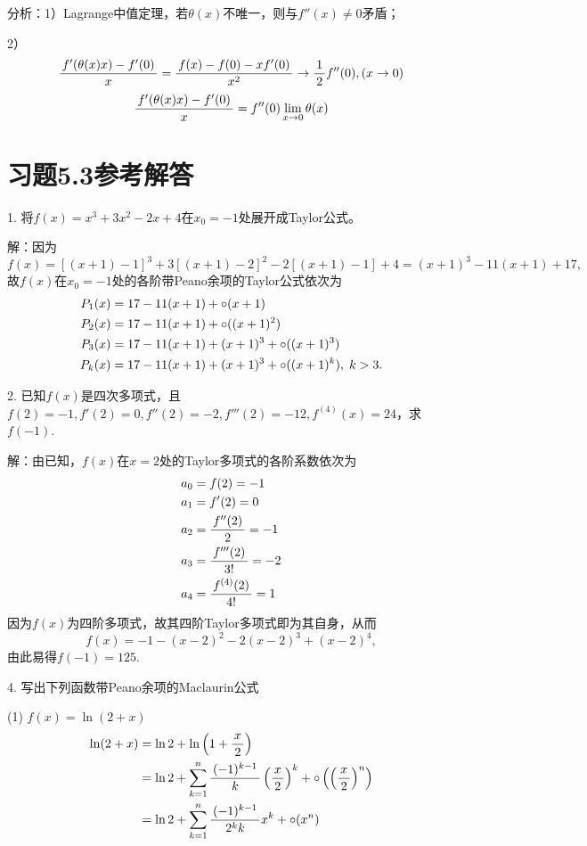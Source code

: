 分析：1）Lagrange中值定理，若$\theta(x)$不唯一，则与$f''(x)\ne 0$矛盾；

2）
$$\displaystyle\frac{\,{f'(\theta(x)x)-f'(0)}\,}{\,{x}\,}=\displaystyle\frac{\,{f(x)-f(0)-xf'(0)}\,}{\,{x^2}\,}\to\displaystyle\frac{\,{1}\,}{\,{2}\,}f''(0),(x\to0)$$
$$\displaystyle\frac{\,{f'(\theta(x)x)-f'(0)}\,}{\,{x}\,}=f''(0)\lim\limits_{x\to{0}}\theta(x)$$

\newpage

\section*{习题5.3参考解答}

1. 将$f(x)=x^3+3x^2-2x+4$在$x_0=-1$处展开成Taylor公式。

解：因为
$$f(x)=[(x+1)-1]^3+3[(x+1)-2]^2-2[(x+1)-1]+4
=(x+1)^3-11(x+1)+17,$$
故$f(x)$在$x_0=-1$处的各阶带Peano余项的Taylor公式依次为
\begin{align}
	P_1(x)&=17-11(x+1)+\circ(x+1)\notag\\
	P_2(x)&=17-11(x+1)+\circ((x+1)^2)\notag\\
	P_3(x)&=17-11(x+1)+(x+1)^3+\circ((x+1)^3)\notag\\
	P_k(x)&=17-11(x+1)+(x+1)^3+\circ((x+1)^k),\;k>3.\notag
\end{align}

\bigskip

2. 已知$f(x)$是四次多项式，且$f(2)=-1,f'(2)=0,f''(2)=-2,f'''(2)=-12,
f^{(4)}(x)=24$，求$f(-1)$.

解：由已知，$f(x)$在$x=2$处的Taylor多项式的各阶系数依次为
\begin{align}
	a_0&=f(2)=-1\notag\\
	a_1&={f'(2)}=0\notag\\
	a_2&=\displaystyle\frac{\,{f''(2)}\,}{\,{2}\,}=-1\notag\\
	a_3&=\displaystyle\frac{\,{f'''(2)}\,}{\,{3!}\,}=-2\notag\\
	a_4&=\displaystyle\frac{\,{f^{(4)}(2)}\,}{\,{4!}\,}=1\notag
\end{align}
因为$f(x)$为四阶多项式，故其四阶Taylor多项式即为其自身，从而
$$f(x)=-1-(x-2)^2-2(x-2)^3+(x-2)^4,$$
由此易得$f(-1)=125$.

\bigskip

4. 写出下列函数带Peano余项的Maclaurin公式

(1) $f(x)=\ln(2+x)$
\begin{align}
	\ln(2+x)&=\ln2+\ln\left(1+\displaystyle\frac{\,{x}\,}{\,{2}\,}\right)\notag\\
	&=\ln2+\sum\limits_{k=1}^n\displaystyle\frac{\,{(-1)^{k-1}}\,}{\,{k}\,}\left(
	\displaystyle\frac{\,{x}\,}{\,{2}\,}\right)^k+\circ\left(\left(\displaystyle\frac{\,{x}\,}{\,{2}\,}\right)^n\right)\notag\\
	&=\ln2+\sum\limits_{k=1}^n\displaystyle\frac{\,{(-1)^{k-1}}\,}{\,{2^kk}\,}x^k+\circ(x^n)\notag
\end{align}

